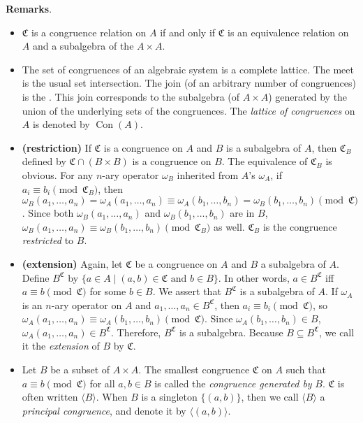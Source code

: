 \documentclass[12pt]{article}
\begin{document}
\textbf{Remarks}.  
\begin{itemize}
\item
$\mathfrak{C}$ is a congruence relation on $A$ if and only if $\mathfrak{C}$ is an equivalence relation on $A$ and a subalgebra of the  $A\times A$.
\item
The set of congruences of an algebraic system is a complete lattice.  The meet is the usual set intersection.  The join (of an arbitrary number of congruences) is the .  This join corresponds to the subalgebra (of $A\times A$) generated by the union of the underlying sets of the congruences.  The \emph{lattice of congruences} on $A$ is denoted by $\operatorname{Con}(A)$.
\item \textbf{(restriction)} 
If $\mathfrak{C}$ is a congruence on $A$ and $B$ is a subalgebra of $A$, then $\mathfrak{C}_B$ defined by $\mathfrak{C}\cap (B\times B)$ is a congruence on $B$.  The equivalence of $\mathfrak{C}_B$ is obvious.  For any $n$-ary operator $\omega_B$ inherited from $A$'s $\omega_A$, if $a_i \equiv b_i \pmod {\mathfrak{C}_B}$, then $\omega_B(a_1,\ldots,a_n)=\omega_A(a_1,\ldots, a_n)\equiv \omega_A(b_1,\ldots,b_n)=\omega_B(b_1,\ldots, b_n) \pmod {\mathfrak{C}}$.  Since both $\omega_B(a_1,\ldots,a_n)$ and $\omega_B(b_1,\ldots,b_n)$ are in $B$, $\omega_B(a_1,\ldots,a_n)\equiv \omega_B(b_1,\ldots, b_n) \pmod {\mathfrak{C}_B}$ as well.  $\mathfrak{C}_B$ is the congruence \emph{restricted} to $B$.
\item \textbf{(extension)} 
Again, let $\mathfrak{C}$ be a congruence on $A$ and $B$ a subalgebra of $A$.  Define $B^{\mathfrak{C}}$ by $\lbrace a\in A\mid (a,b)\in \mathfrak{C}\mbox{ and }b\in B\rbrace$.  In other words, $a\in B^{\mathfrak{C}}$ iff $a \equiv b \pmod {\mathfrak{C}}$ for some $b\in B$.  We assert that $B^{\mathfrak{C}}$ is a subalgebra of $A$.  If $\omega_A$ is an $n$-ary operator on $A$ and $a_1,\ldots,a_n\in B^{\mathfrak{C}}$, then $a_i\equiv b_i \pmod {\mathfrak{C}}$, so $\omega_A(a_1,\ldots,a_n)\equiv \omega_A(b_1,\ldots,b_n) \pmod {\mathfrak{C}}$.  Since $\omega_A(b_1,\ldots,b_n)\in B$, $\omega_A(a_1,\ldots,a_n)\in B^{\mathfrak{C}}$.  Therefore, $B^{\mathfrak{C}}$ is a subalgebra.  Because $B\subseteq B^{\mathfrak{C}}$, we call it the \emph{extension} of $B$ by $\mathfrak{C}$.
\item
Let $B$ be a subset of $A\times A$.  The smallest congruence $\mathfrak{C}$ on $A$ such that $a\equiv b\pmod {\mathfrak{C}}$ for all $a,b\in B$ is called the \emph{congruence generated by} $B$.  $\mathfrak{C}$ is often written $\langle B\rangle$.  When $B$ is a singleton $\lbrace (a,b)\rbrace$, then we call $\langle B\rangle$ a \emph{principal congruence}, and denote it by $\langle (a,b)\rangle$.
\end{itemize}
\end{document}

